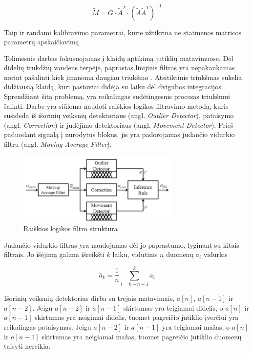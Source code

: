 \begin{equation}
    \tilde{M} = G \cdot \tilde{A}^T \cdot (\tilde{A}\tilde{A}^T)^{-1}
\end{equation}

Taip ir randami kalibravimo parametrai, kurie užtikrina ne statmenos matricos parametrų apskaičiavimą. 

Tolimesnis darbas fokusuojamas į klaidų aptikimą jutiklių matavimuose. Dėl didelių trukdžių vandens terpėje, paprastas linijinis filtras yra nepakankamas norint pašalinti kiek įmanoma daugiau triukšmo \cite{gaysse2005using}. Atsitiktinis triukšmas sukelia didžiausią klaidą, kuri pastoviai didėja su laiku dėl dvigubos integracijos. Sprendžiant šitą problemą, yra reikalingas sudėtingesnis procesas triukšmui šalinti. Darbe yra siūloma naudoti raiškios logikos filtravimo metodą, kuris susideda iš išorinių veiksnių detektoriaus (angl. \textit{Outlier Detector}), pataisymo (angl. \textit{Correction}) ir judėjimo detektoriaus (angl. \textit{Movement Detector}). Prieš paduodant signalą į nurodytus blokus, jis yra padorojamas judančio vidurkio filtru (angl. \textit{Moving Average Filter}).

\begin{figure}[H]
    \centering
    \includegraphics[width=300px]{img/fuzzy_filter_structure.png}
    \caption{Raiškios logikos filtro struktūra \cite{yoo2011fuzzy}}
    \label{fig:fuzzy_filter_structure}
\end{figure}

Judančio vidurkio filtras yra naudojamas dėl jo paprastumo, lyginant su kitais filtrais. Jo išėjimą galima išreikšti $k$ laiku, vidutinis $n$ duomenų $a_i$ vidurkis

\begin{equation}
    \bar{a}_k = \frac{1}{n} \sum_{i=k-n+1}^{k} a_i
\end{equation}

Išorinių veiksnių detektorius dirba su trejais matavimais, $a[n]$, $a[n-1]$ ir $a[n-2]$. Jeigu $a[n-2]$ ir $a[n-1]$ skirtumas yra teigiamai didelis, o $a[n]$ ir $a[n-1]$ skirtumas yra neigimai didelis, tuomet pagreičio jutiklio įverčiui yra reikalingas pataisymas. Jeigu $a[n-2]$ ir $a[n-1]$ yra teigiamai mažas, o $a[n]$ ir $a[n-1]$ skirtumas yra neigiamai mažas, tuomet pagreičio jutiklio duomenų taisyti nereikia. 

